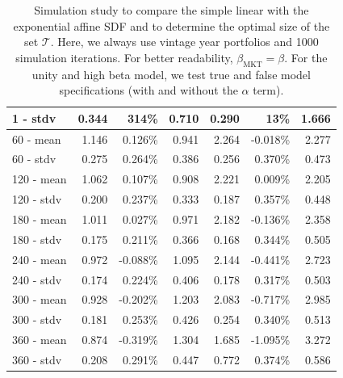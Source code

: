 \documentclass[12pt]{article}
\begin{document}
\begin{table}[ht]
\begin{tabular}{lrrrrrr}
		1 - stdv & 0.344 & 314\% & 0.710 & 0.290 & 13\% & 1.666 \\ 
		\hline
		60 - mean & 1.146 & 0.126\% & 0.941 & 2.264 & -0.018\% & 2.277 \\ 
		60 - stdv & 0.275 & 0.264\% & 0.386 & 0.256 & 0.370\% & 0.473 \\ 
		\hline
		120 - mean & 1.062 & 0.107\% & 0.908 & 2.221 & 0.009\% & 2.205 \\ 
		120 - stdv & 0.200 & 0.237\% & 0.333 & 0.187 & 0.357\% & 0.448 \\ 
		\hline
		180 - mean & 1.011 & 0.027\% & 0.971 & 2.182 & -0.136\% & 2.358 \\ 
		180 - stdv & 0.175 & 0.211\% & 0.366 & 0.168 & 0.344\% & 0.505 \\ 
		\hline
		240 - mean & 0.972 & -0.088\% & 1.095 & 2.144 & -0.441\% & 2.723 \\ 
		240 - stdv & 0.174 & 0.224\% & 0.406 & 0.178 & 0.317\% & 0.503 \\ 
		\hline
		300 - mean & 0.928 & -0.202\% & 1.203 & 2.083 & -0.717\% & 2.985 \\ 
		300 - stdv & 0.181 & 0.253\% & 0.426 & 0.254 & 0.340\% & 0.513 \\ 
		\hline
		360 - mean & 0.874 & -0.319\% & 1.304 & 1.685 & -1.095\% & 3.272 \\ 
		360 - stdv & 0.208 & 0.291\% & 0.447 & 0.772 & 0.374\% & 0.586 \\ 
		\hline
		\hline
	\end{tabular}
	\caption{
		Simulation study to compare the simple linear with the exponential affine SDF and to determine the optimal size of the set $\mathcal{T}$.
		Here, we always use vintage year portfolios and 1000 simulation iterations.
		For better readability, $\beta_{\mathrm{MKT}}=\beta$.
		For the unity and high beta model, we test true and false model specifications (with and without the $\alpha$ term).
	} 
	\label{tab:simulation_study}
\end{table}
\end{document}
